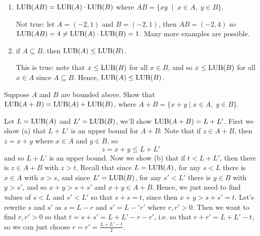 \documentclass[11pt,dvipsnames]{book}
\numberwithin{equation}{section} %
\numberwithin{figure}{section} %
\numberwithin{table}{section} %
\begin{document}
\begin{exercise}
\begin{enumerate}[label=(\alph*)]
\item ${\rm LUB}(AB)={\rm LUB}(A)\cdot {\rm LUB}(B)$ where $AB=\{xy \;\; | \;\; x\in A,\; y\in B\}$.
\begin{solution}
Not true: let $A=(-2,1)$ and $B=(-2,1)$, then $AB=(-2,4)$ so ${\rm LUB}(AB)=4\neq {\rm LUB}(A)\cdot {\rm LUB}(B)=1$. Many more examples are possible.
\end{solution}
\item if $A\subseteq B$, then ${\rm LUB}(A)\leq {\rm LUB}(B)$. 
\begin{solution}
This is true: note that $x\leq {\rm LUB}(B)$ for all $x\in B$, and so $x\leq {\rm LUB}(B)$ for all $x\in A$ since $A\subseteq B$. Hence, ${\rm LUB}(A)\leq {\rm LUB}(B)$.
\end{solution}
\end{enumerate}


\end{exercise}


\begin{exercise}
Suppose $A$ and $B$ are bounded above. Show that ${\rm LUB}(A+B)={\rm LUB}(A)+{\rm LUB}(B)$, where $A+B=\{x+y\; | \; x\in A,\; y\in B\}$.
\begin{solution}
Let $L={\rm LUB}(A)$ and $L'={\rm LUB}(B)$, we'll show ${\rm LUB}(A+B)=L+L'$. First we show (a) that $L+L'$ is an upper bound for $A+B$: Note that if $z\in A+B$, then $z=x+y$ where $x\in A$ and $y\in B$, so 
\[
z=x+y\leq L+L'
\]
and so $L+L'$ is an upper bound. Now we show (b) that if $t<L+L'$, then there is $z\in A+B$ with $z>t$. Recall that since $L={\rm LUB}(A)$, for any $s<L$ there is $x\in A$ with $x>s$, and since $L'={\rm LUB}(B)$, for any $s'<L'$ there is $y\in B$ with $y>s'$, and so $x+y>s+s'$ and $x+y\in A+B$. Hence, we just need to find values of $s<L$ and $s'<L'$ so that $s+s= t$, since then $x+y>s+s'= t$. Let's rewrite $s$ and $s'$ as $s=L-r$ and $s'=L-'r'$ where $r,r'>0$. Then we want to find $r,r'>0$ so that $t=s+s'=L+L'-r-r'$, i.e. so that $r+r'=L+L'-t$, so we can just choose $r=r'=\frac{L+L'-t}{2}$. 
\end{solution}
\end{exercise}
\end{document}
